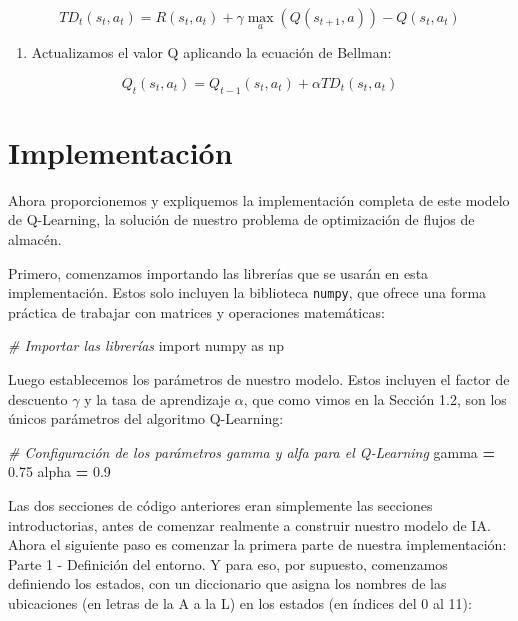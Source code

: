 \documentclass[
]{book}
\newenvironment{Shaded}{\begin{snugshade}}{\end{snugshade}}
\newcommand{\CommentTok}[1]{\textcolor[rgb]{0.56,0.35,0.01}{\textit{#1}}}
\newcommand{\FloatTok}[1]{\textcolor[rgb]{0.00,0.00,0.81}{#1}}
\newcommand{\ImportTok}[1]{#1}
\newcommand{\NormalTok}[1]{#1}
\newcommand{\OperatorTok}[1]{\textcolor[rgb]{0.81,0.36,0.00}{\textbf{#1}}}
\providecommand{\tightlist}{%
  \setlength{\itemsep}{0pt}\setlength{\parskip}{0pt}}
\begin{document}
\[TD_t(s_t,a_t) = R(s_t,a_t) + \gamma \underset{a}{\max}(Q(s_{t+1},a)) - Q(s_t, a_t)\]

\begin{enumerate}
\def\labelenumi{\arabic{enumi}.}
\setcounter{enumi}{4}
\tightlist
\item
  Actualizamos el valor Q aplicando la ecuación de Bellman:
\end{enumerate}

\[Q_t(s_t,a_t) = Q_{t-1}(s_t,a_t) + \alpha TD_t(s_t,a_t)\]

\hypertarget{implementaciuxf3n}{%
\section{Implementación}\label{implementaciuxf3n}}

Ahora proporcionemos y expliquemos la implementación completa de este modelo de Q-Learning, la solución de nuestro problema de optimización de flujos de almacén.

Primero, comenzamos importando las librerías que se usarán en esta implementación. Estos solo incluyen la biblioteca \texttt{numpy}, que ofrece una forma práctica de trabajar con matrices y operaciones matemáticas:

\begin{Shaded}
\begin{Highlighting}[]
\CommentTok{\# Importar las librerías}
\ImportTok{import}\NormalTok{ numpy }\ImportTok{as}\NormalTok{ np}
\end{Highlighting}
\end{Shaded}

Luego establecemos los parámetros de nuestro modelo. Estos incluyen el factor de descuento \(\gamma\) y la tasa de aprendizaje \(\alpha\), que como vimos en la Sección 1.2, son los únicos parámetros del algoritmo Q-Learning:

\begin{Shaded}
\begin{Highlighting}[]
\CommentTok{\# Configuración de los parámetros gamma y alfa para el Q{-}Learning}
\NormalTok{gamma }\OperatorTok{=} \FloatTok{0.75}
\NormalTok{alpha }\OperatorTok{=} \FloatTok{0.9}
\end{Highlighting}
\end{Shaded}

Las dos secciones de código anteriores eran simplemente las secciones introductorias, antes de comenzar realmente a construir nuestro modelo de IA. Ahora el siguiente paso es comenzar la primera parte de nuestra implementación: Parte 1 - Definición del entorno. Y para eso, por supuesto, comenzamos definiendo los estados, con un diccionario que asigna los nombres de las ubicaciones (en letras de la A a la L) en los estados (en índices del 0 al 11):
\end{document}
